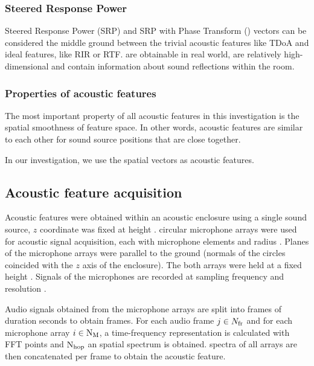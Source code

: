 \documentclass[applsci,article,submit,moreauthors,pdftex]{Definitions/mdpi}
\begin{document}
\subsubsection{Steered Response Power}
Steered Response Power (SRP) and SRP with Phase Transform (\srpphat{}) vectors can be considered the middle ground between the trivial acoustic features like TDoA and ideal features, like RIR or RTF. 
\srpphat{} are obtainable in real world, are relatively high-dimensional and contain information about sound reflections within the room.

\subsubsection{Properties of acoustic features}
The most important property of all acoustic features in this investigation is the spatial smoothness of feature space. In other words, acoustic features are similar to each other for sound source positions that are close together.

In our investigation, we use the \srpphat{} spatial vectors as acoustic features.

\subsection{Acoustic feature acquisition}
Acoustic features were obtained within an acoustic enclosure using a single sound source, $ z $ coordinate was fixed at height \hsrc{}. \Narr{} circular microphone arrays were used for acoustic signal acquisition, each with \Nmic{} microphone elements and radius \rarr{}.
Planes of the microphone arrays were parallel to the ground (normals of the circles coincided with the $ z $ axis of the enclosure).
The both arrays were held at a fixed height \harr{}.
Signals of the microphones are recorded at sampling frequency \fs{} and resolution \resolution{}.

Audio signals obtained from the microphone arrays are split into frames of duration \framedur{} seconds to obtain \Nframes{} frames. For each audio frame $ j{} \in N_{\mathrm{fr}}{} $ and for each microphone array $ i{} \in \mathrm{N}_{\mathrm{M}} $, a time-frequency representation is calculated with \NFFT{} FFT points and $ \mathrm{N}_{\mathrm{hop}} $  an \srpphat{} spatial spectrum \SRPspectrum{} is obtained. 
\srpphat{} spectra of all arrays are then concatenated per frame to obtain the acoustic feature.
\end{document}
